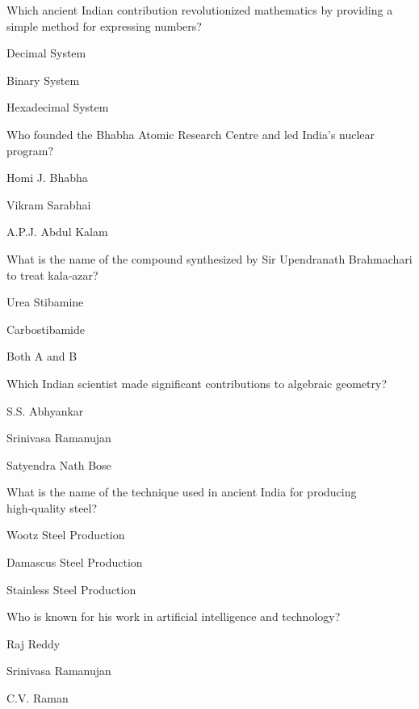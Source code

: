 \begin{enhancedmcq}{Which ancient Indian contribution revolutionized mathematics by providing a simple method for expressing numbers?}
\item Decimal System
\item Binary System
\item Hexadecimal System

\end{enhancedmcq}
\begin{enhancedmcq}{Who founded the Bhabha Atomic Research Centre and led India's nuclear program?}
\item Homi J. Bhabha
\item Vikram Sarabhai
\item A.P.J. Abdul Kalam

\end{enhancedmcq}
\begin{enhancedmcq}{What is the name of the compound synthesized by Sir Upendranath Brahmachari to treat kala‑azar?}
\item Urea Stibamine
\item Carbostibamide
\item Both A and B

\end{enhancedmcq}
\begin{enhancedmcq}{Which Indian scientist made significant contributions to algebraic geometry?}
\item S.S. Abhyankar
\item Srinivasa Ramanujan
\item Satyendra Nath Bose

\end{enhancedmcq}
\begin{enhancedmcq}{What is the name of the technique used in ancient India for producing high‑quality steel?}
\item Wootz Steel Production
\item Damascus Steel Production
\item Stainless Steel Production

\end{enhancedmcq}
\begin{enhancedmcq}{Who is known for his work in artificial intelligence and technology?}
\item Raj Reddy
\item Srinivasa Ramanujan
\item C.V. Raman

\end{enhancedmcq}
